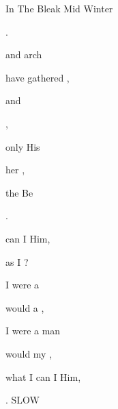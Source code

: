 \begin{SBSong}{In The Bleak Mid Winter}
\begin{SBVerse}
     .
  \end{SBVerse}
  \CBPageBrk
  \begin{SBVerse}
     and arch 
    
     have gathered ,
    
     and  
    
      ,
    
     only His 
    
     her  , 
    
     the Be 
    
      .
  \end{SBVerse}
  \begin{SBVerse}
     can I  Him, 
    
     as I ?
    
     I were a 
    
     would  a ,
    
     I were a  man
    
     would  my , 
    
     what I can I  Him, 
    
      . {SLOW}
 \end{SBVerse}
\end{SBSong}
